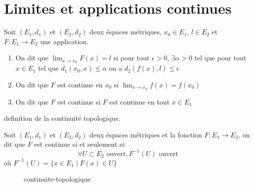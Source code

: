 \section{Limites et applications continues}
\begin{definition}
    Soit $(E_{1}, d_1)$ et $(E_2, d_2)$ deux éspaces métriques, $x_0 \in E_1$, $l \in E_2$ et $F: E_1 \to E_2$ une application.
    \begin{enumerate}
        \item On dit que $\lim_{x \to x_0} F(x) = l$ si pour tout $\epsilon > 0, \, \exists \alpha > 0$ tel que pour tout $x \in E_1$ tel que  $d_1(x_0, x) \le \alpha$ on a $d_2(f(x), l) \le \epsilon$ 
        \item On dit que $F$ est continue en  $x_0$ si $\lim_{x \to x_0} f(x) = f(x_0)$
        \item On dit que $F$ est continue si  $F$ est continue en tout $x \in E_1$
    \end{enumerate}
\end{definition}
\begin{prop}\label{def:continuite-topologique}
    definition de la continuité topologique.
    \par
    Soit $(E_{1}, d_1)$ et $(E_2, d_2)$ deux éspaces métriques et la fonction $F: E_1 \to E_2$, on dit que  $F$ est continue si et seulement si:
     \[
         \forall U \subset E_2 \text{ ouvert},  F^{-1}(U) \text{ ouvert}
    \] 
    où $F^{-1}(U) = \{ x \in E_1 \mid F(x) \in U\}$
\begin{figure}[H]
    \centering
    \caption{continuite-topologique}
    \label{fig:continuite-topologique}
\end{figure}
\end{prop}

